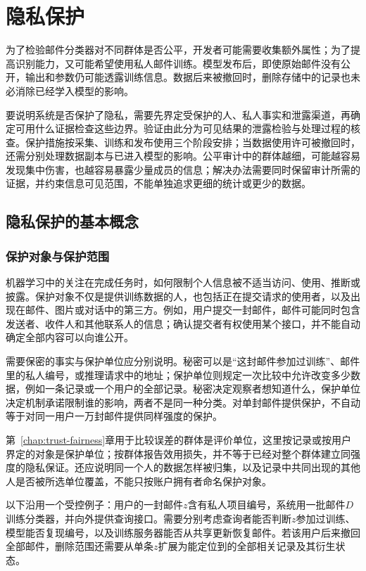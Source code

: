 \chapter{隐私保护}
\label{chap:trust-privacy}

为了检验邮件分类器对不同群体是否公平，开发者可能需要收集额外属性；为了提高识别能力，又可能希望使用私人邮件训练。模型发布后，即使原始邮件没有公开，输出和参数仍可能透露训练信息。数据后来被撤回时，删除存储中的记录也未必消除已经学入模型的影响。

要说明系统是否保护了隐私，需要先界定受保护的人、私人事实和泄露渠道，再确定可用什么证据检查这些边界。验证由此分为可见结果的泄露检验与处理过程的核查。保护措施按采集、训练和发布使用三个阶段安排；当数据使用许可被撤回时，还需分别处理数据副本与已进入模型的影响。公平审计中的群体越细，可能越容易发现集中伤害，也越容易暴露少量成员的信息；解决办法需要同时保留审计所需的证据，并约束信息可见范围，不能单独追求更细的统计或更少的数据。

\section{隐私保护的基本概念}
\label{sec:privacy-concepts}

\subsection{保护对象与保护范围}
\label{sec:privacy-subjects}

机器学习中的关注在完成任务时，如何限制个人信息被不适当访问、使用、推断或披露。保护对象不仅是提供训练数据的人，也包括正在提交请求的使用者，以及出现在邮件、图片或对话中的第三方。例如，用户提交一封邮件，邮件可能同时包含发送者、收件人和其他联系人的信息；确认提交者有权使用某个接口，并不能自动确定全部内容可以向谁公开。

需要保密的事实与保护单位应分别说明。秘密可以是“这封邮件参加过训练”、邮件里的私人编号，或推理请求中的地址；保护单位则规定一次比较中允许改变多少数据，例如一条记录或一个用户的全部记录。秘密决定观察者想知道什么，保护单位决定机制承诺限制谁的影响，两者不是同一种分类。对单封邮件提供保护，不自动等于对同一用户一万封邮件提供同样强度的保护。

第~\ref{chap:trust-fairness}章用于比较误差的群体是评价单位，这里按记录或按用户界定的对象是保护单位；按群体报告效用损失，并不等于已经对整个群体建立同强度的隐私保证。还应说明同一个人的数据怎样被归集，以及记录中共同出现的其他人是否被所选单位覆盖，不能只按账户拥有者命名保护对象。

以下沿用一个受控例子：用户的一封邮件$z$含有私人项目编号，系统用一批邮件$D$训练分类器，并向外提供查询接口。需要分别考虑查询者能否判断$z$参加过训练、模型能否复现编号，以及训练服务器能否从共享更新恢复邮件。若该用户后来撤回全部邮件，删除范围还需要从单条$z$扩展为能定位到的全部相关记录及其衍生状态。

